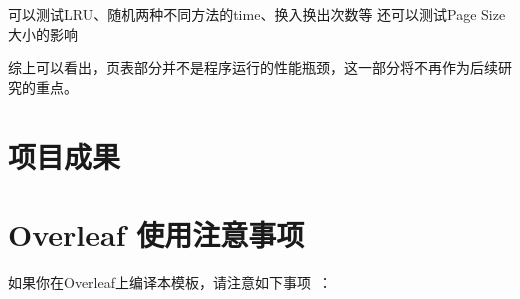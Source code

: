 可以测试LRU、随机两种不同方法的time、换入换出次数等
还可以测试Page Size大小的影响

综上可以看出，页表部分并不是程序运行的性能瓶颈，这一部分将不再作为后续研究的重点。

\section{项目成果}



\section{Overleaf 使用注意事项}

如果你在Overleaf上编译本模板，请注意如下事项~\cite{zjuthesis}：